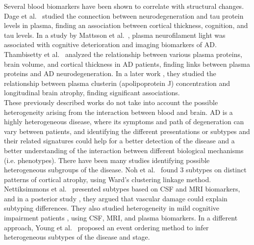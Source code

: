 
Several blood biomarkers have been shown to correlate with structural changes. Dage et al.\ \cite{Dage2016} studied the connection between neurodegeneration and tau protein levels in plasma, finding an association between cortical thickness, cognition, and tau levels. In a study by Mattsson et al.\ \cite{Mattsson2017}, plasma neurofilament light was associated with cognitive deterioration and imaging biomarkers of AD. Thambisetty et al.\ \cite{Thambisetty2011} analyzed the relationship between various plasma proteins, brain volume, and cortical thickness in AD patients, finding links between plasma proteins and AD neurodegeneration. In a later work \cite{Thambisetty2012}, they studied the relationship between plasma clusterin (apolipoprotein J) concentration and longitudinal brain atrophy, finding significant associations. \\

These previously described works do not take into account the possible heterogeneity arising from the interaction between blood and brain. AD is a highly heterogeneous disease, where its symptoms and path of degeneration can vary between patients, and identifying the different presentations or subtypes and their related signatures could help for a better detection of the disease and a better understanding of the interaction between different biological mechanisms (i.e. phenotypes). There have been many studies identifying possible heterogeneous subgroups of the disease. Noh et al.\ \cite{Noh2014} found 3 subtypes on distinct patterns of cortical atrophy, using Ward's clustering linkage method. Nettiksimmons et al.\ \cite{Nettiksimmons2010} presented subtypes based on CSF and MRI biomarkers, and in a posterior study \cite{Nettiksimmons2013}, they argued that vascular damage could explain subtyping differences. They also studied heterogeneity in mild cognitive impairment patients \cite{Nettiksimmons2014}, using CSF, MRI, and plasma biomarkers. In a different approach, Young et al.\ \cite{Young2015a,Young2017} proposed an event ordering method to infer heterogeneous subtypes of the disease and stage.  \\

